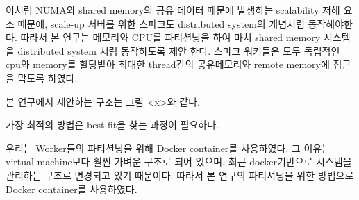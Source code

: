 \else

\fi

\ifkor
이처럼 NUMA와 shared memory의 공유 데이터 때문에 발생하는 scalability 저해 요소 때문에, 
scale-up 서버를 위한 스파크도 distributed system의 개념처럼 동작해야한다.
따라서 본 연구는 메모리와 CPU를 파티션닝을 하여 마치 shared memory 시스템을 distributed system 
처럼 동작하도록 제안 한다.
스마크 워커들은 모두 독립적인 cpu와 memory를 할당받아 최대한 thread간의 공유메모리와 remote
memory에 접근을 막도록 하였다.
\else

\fi




\ifkor
본 연구에서 제안하는 구조는 그림 <x>와 같다. 

가장 최적의 방법은 best fit을 찾는 과정이 필요하다. 


\else

\fi




\ifkor
우리는 Worker들의 파티션닝을 위해 Docker container를 사용하였다. 
그 이유는 virtual machine보다 훨씬 가벼운 구조로 되어 있으며,  
최근 docker기반으로 시스템을 관리하는 구조로 변경되고 있기 때문이다.
따라서 본 연구의 파티셔닝을 위한 방법으로 Docker container를 사용하였다.
\else

\fi




